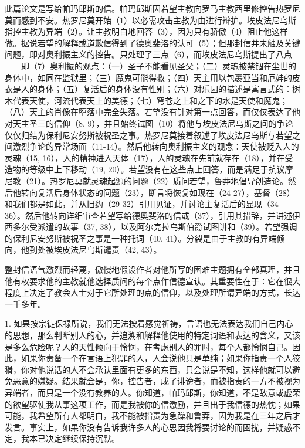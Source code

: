 此篇论文是写给帕玛邱斯的信。帕玛邱斯因若望主教向罗马主教西里修控告热罗尼莫而感到不安。热罗尼莫开始（1）以必需攻击主教为由进行辩护。埃皮法尼乌斯指控主教为异端（2）。让主教明白地回答（3），因为只有骄傲（4）阻止他这样做。据说若望的解释或道歉信得到了德奥斐洛的认可（5）；但那封信并未触及关键问题，即对奥利振主义的控告。只处理了三点（6），而埃皮法尼乌斯提出了八点——即（7）奥利振的观点：（一）圣子不能看见圣父；（二）灵魂被禁锢在尘世的身体中，如同在监狱里；（三）魔鬼可能得救；（四）天主用以包裹亚当和厄娃的皮衣是人的身体；（五）复活后的身体没有性别；（六）对乐园的描述是寓言式的：树木代表天使，河流代表天上的美德；（七）穹苍之上和之下的水是天使和魔鬼；（八）天主的肖像在堕落中完全失落。若望没有针对第一点回答，而仅仅表达了他对天主圣三的信仰（8, 9），并且始终试图（10）将他与埃皮法尼乌斯之间的争论仅仅归结为保利尼安努斯被祝圣之事。热罗尼莫接着叙述了埃皮法尼乌斯与若望之间激烈争论的异常场面（11-14）。然后他转向奥利振主义的观念：天使被贬入人的灵魂（15, 16），人的精神进入天体（17），人的灵魂在先前就存在（18），并在受造物的等级中上下移动（19, 20）。若望没有在这些点上回答，而是满足于抗议摩尼教（21）。热罗尼莫就灵魂起源的问题（22）质问若望，鲁莽地倡导创造论。然后他转向复活后身体状态的问题（23），断言将恢复如现在（24-27），基督（28）和我们都是如此，并从旧约（29-32）引用见证，并讨论主复活后的显现（34-36）。然后他转向详细审查若望写给德奥斐洛的信或（37），引用其措辞，并讲述伊西多尔受派遣的故事（37, 38），以及阿尔克拉乌斯伯爵试图讲和（39）。若望强调的保利尼安努斯被祝圣之事是一种托词（40, 41）。分裂是由于主教的有异端倾向，他到处被埃皮法尼乌斯谴责（42, 43）。\par

整封信语气激烈而轻蔑，傲慢地假设作者对他所写的困难主题拥有全部真理，并且他有权要求他的主教就他选择质问的每个点作信德宣认。其重要性在于：它在很大程度上决定了教会人士对于它所处理的点的信仰，以及处理所谓异端的方式，长达一千多年。\par

1. 如果按宗徒保禄所说，我们无法按着感觉祈祷，言语也无法表达我们自己内心的思想，那么判断别人的心，并追溯和解释他使用的特定词语和表达的含义，又该是多么危险呢？人的天性倾向于怜悯，在考虑别人的罪时，每个人都怜悯自己。因此，如果你责备一个在言语上犯罪的人，人会说他只是单纯；如果你指责一个人狡猾，你对他说话的人不会承认里面有更多的东西，只会说是不知，这样他就可以避免恶意的嫌疑。结果就会是，你，控告者，成了诽谤者，而被指责的一方不被视为异端者，而只是一个没有教养的人。你知道，帕玛邱斯，你知道，不是敌意或虚荣的欲望驱使我从事这项工作，而是我被你的信激励，并且出于我信德的热忱；如果可能，我希望所有人都明白，我不能被指责为急躁和鲁莽，因为我是在三年之后才发言。事实上，如果你没有告诉我许多人的心思因我将要讨论的而困扰，并疑惑不定，我本已决定继续保持沉默。\par

